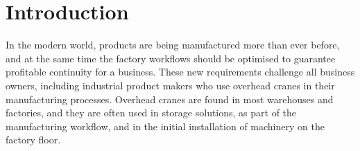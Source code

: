 \documentclass[12pt,a4paper,oneside,pdftex]{report}
\begin{document}


\chapter{Introduction}
\label{chapter:introduction}

In the modern world, products are being manufactured more than ever before, and at the same time the factory workflows should be optimised to guarantee profitable continuity for a business. These new requirements challenge all business owners, including industrial product makers who use overhead cranes in their manufacturing processes. Overhead cranes are found in most warehouses and factories, and they are often used in storage solutions, as part of the manufacturing workflow, and in the initial installation of machinery on the factory floor.
\end{document}
